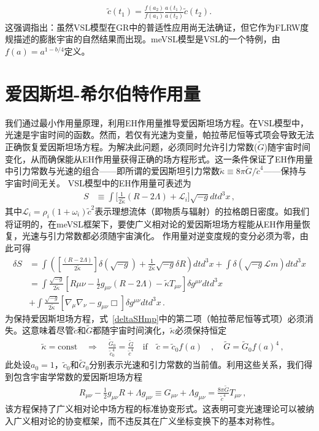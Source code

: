 \documentclass[jkps,preprint,fleqn]{revtex4}
\newcommand{\tc}{\tilde{c}}
\newcommand{\tG}{\tilde{G}}
\newcommand{\tkapp}{\tilde{\kappa}}
\begin{document}
\begin{CJK*}{UTF8}{gbsn}
\begin{align} \tc(t_1) = \frac{f(a_2)}{f(a_1)} \frac{a(t_1)}{a(t_2)} \tc(t_2) \label{cVSL}. \end{align}这强调指出：虽然VSL模型在GR中的普适性应用尚无法确证，但它作为FLRW度规描述的膨胀宇宙的自然结果而出现。meVSL模型是VSL的一个特例，由$f(a) = a^{1-b/4}$定义\cite{Lee:2020zts,Lee:2023bjz}。
\section{爱因斯坦-希尔伯特作用量}\label{sec:HEaction}

我们通过最小作用量原理，利用EH作用量推导爱因斯坦场方程。在VSL模型中，光速是宇宙时间的函数。然而，若仅有光速为变量，帕拉蒂尼恒等式项会导致无法正确恢复爱因斯坦场方程。为解决此问题，必须同时允许引力常数($\tG$)随宇宙时间变化，从而确保能从EH作用量获得正确的场方程形式\cite{Lee:2020zts}。这一条件保证了EH作用量中引力常数与光速的组合——即所谓的爱因斯坦引力常数$\tkapp \equiv 8 \pi \tG/\tc^4$——保持与宇宙时间无关。
VSL模型中的EH作用量可表述为
\begin{align} S &\equiv \int \Biggl[ \frac{1}{2 \tkapp} \left( R - 2 \Lambda \right) + \mathcal{L}_i \Biggr] \sqrt{-g} dt d^3x \label{SHmp} \,, \end{align}
其中$\mathcal{L}_i = \rho_i (1 + \omega_i) \tc^2$表示理想流体（即物质与辐射）的拉格朗日密度。如我们将证明的，在meVSL框架下，要使广义相对论的爱因斯坦场方程能从EH作用量恢复，光速与引力常数都必须随宇宙演化。
作用量对逆变度规的变分必须为零，由此可得
\begin{align} \delta S &= \int \left( \left[ \frac{\left( R - 2 \Lambda \right)}{2 \tkapp} \right] \delta \left( \sqrt{-g} \right)  + \frac{1}{2\tkapp} \sqrt{-g} \delta R \right) dt d^3 x + \int \delta \left( \sqrt{-g} \mathcal{L}{m} \right) dt d^3 x \nonumber \\ &= \int \frac{\sqrt{-g}}{2 \tkapp} \left[ R{\mu\nu} - \frac{1}{2} g_{\mu\nu} \left( R - 2 \Lambda \right) - \tkapp T_{\mu\nu} \right] \delta g^{\mu\nu} dtd^3 x \nonumber \\ &+ \int \frac{\sqrt{-g}}{2 \tkapp} \left[ \nabla_{\mu} \nabla_{\nu} - g_{\mu\nu} \Box \right] \delta g^{\mu\nu} dtd^3 x \label{deltaSHmp} \,. \end{align}
为保持爱因斯坦场方程，式~\eqref{deltaSHmp}中的第二项（帕拉蒂尼恒等式项）必须消失。这意味着尽管$\tc$和$\tG$都随宇宙时间演化，$\tkapp$必须保持恒定
\begin{align}
&\tkapp = \text{const} \quad \Rightarrow \quad \frac{\tG_0}{\tc_0^4} = \frac{\tG}{\tc^4} \quad \textrm{if} \quad \tc = \tc_0 f(a) \quad , \quad \tG = \tG_{0} f(a)^4 \label{tkappaconstmp} \,,
\end{align}
此处设$a_0 = 1$，$\tc_0$和$\tG_0$分别表示光速和引力常数的当前值。利用这些关系，我们得到包含宇宙学常数的爱因斯坦场方程
\begin{align} &R_{\mu\nu} - \frac{1}{2} g_{\mu\nu} R + \Lambda g_{\mu\nu} \equiv G_{\mu\nu} + \Lambda g_{\mu\nu}  = \frac{8 \pi \tG}{\tc^4} T_{\mu\nu} \label{tEFEmp} \,, \end{align}
该方程保持了广义相对论中场方程的标准协变形式。这表明可变光速理论可以被纳入广义相对论的协变框架，而不违反其在广义坐标变换下的基本对称性。

\end{CJK*}
\end{document}
